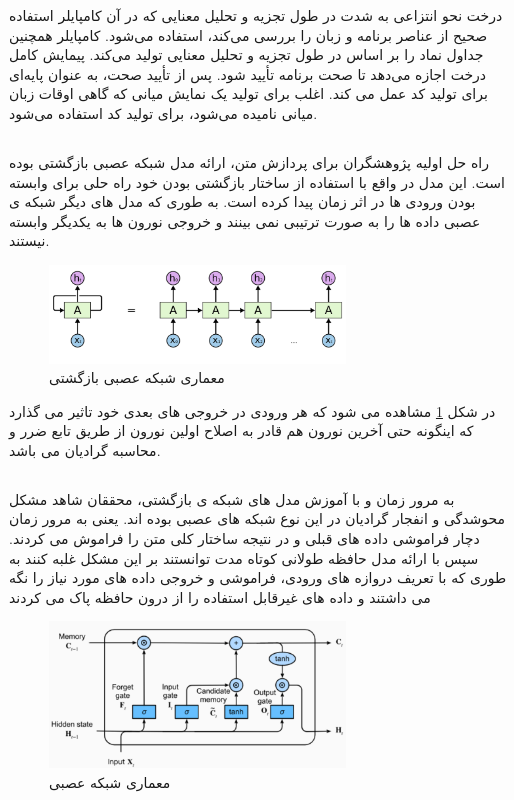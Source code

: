 درخت نحو انتزاعی به شدت در طول تجزیه و تحلیل معنایی که در آن کامپایلر استفاده صحیح از عناصر برنامه و زبان را بررسی می‌کند، استفاده می‌شود. کامپایلر همچنین جداول نماد را بر اساس   در طول تجزیه و تحلیل معنایی تولید می‌کند. پیمایش کامل درخت اجازه می‌دهد تا صحت برنامه تأیید شود.
پس از تأیید صحت،   به عنوان پایه‌ای برای تولید کد عمل می کند.   اغلب برای تولید یک نمایش میانی   که گاهی اوقات زبان میانی نامیده می‌شود، برای تولید کد استفاده می‌شود.
\subsection {}  
راه حل اولیه پژوهشگران برای پردازش متن، ارائه مدل شبکه عصبی بازگشتی بوده است.  این مدل در واقع با
استفاده از ساختار بازگشتی بودن خود راه حلی برای وابسته بودن ورودی ها در اثر زمان پیدا کرده است. به طوری که
مدل های دیگر شبکه ی عصبی داده ها را به صورت ترتیبی نمی بینند و خروجی نورون ها به یکدیگر وابسته نیستند.
\begin{figure}[H]
	\centering
	\includegraphics[width=0.7\textwidth]{figures/RNN.png}
	\caption{معماری شبکه عصبی بازگشتی}
	\label{fig:RNN}
\end{figure}

در شکل \ref{fig:RNN} مشاهده می شود که هر ورودی در خروجی های بعدی خود تاثیر می گذارد که اینگونه حتی آخرین نورون
هم قادر به اصلاح اولین نورون از طریق تابع ضرر و محاسبه گرادیان می باشد.

\subsection{}
به مرور زمان و با آموزش مدل های شبکه ی بازگشتی، محققان شاهد مشکل محوشدگی و انفجار گرادیان در این نوع
شبکه های عصبی بوده اند. یعنی به مرور زمان دچار فراموشی داده های قبلی و در نتیجه ساختار کلی متن را فراموش
می کردند. 
سپس با ارائه مدل حافظه طولانی کوتاه مدت  توانستند بر این مشکل غلبه کنند به طوری که با تعریف دروازه های
ورودی، فراموشی و خروجی داده های مورد نیاز را نگه می داشتند و داده های غیرقابل استفاده را از درون حافظه پاک
می کردند

\begin{figure}[H]
	\centering
	\includegraphics[width=0.7\textwidth]{figures/LSTM.png}
	\caption{معماری شبکه عصبی }
	\label{fig:LSTM}
\end{figure}

